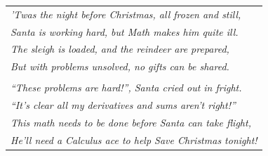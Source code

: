 \documentclass[12pt,letterpaper]{exam}
\begin{document}
\examtitle
{} 
\scores
\bottomline
\newpage

\phantom{.} \vfill
	\begin{table}[h]
	\centering
	\begin{tabular}{l}
	{\itshape ’Twas the night before Christmas, all frozen and still,} \\
	{\itshape Santa is working hard, but Math makes him quite ill.} \\
	{\itshape The sleigh is loaded, and the reindeer are prepared,} \\ 
	{\itshape But with problems unsolved, no gifts can be shared.} \\
	\\
	{\itshape ``These problems are hard!'', Santa cried out in fright.} \\
	{\itshape ``It's clear all my derivatives and sums aren't right!''} \\
	{\itshape This math needs to be done before Santa can take flight,} \\
	{\itshape He'll need a Calculus ace to help Save Christmas tonight!}
	\end{tabular}
	\end{table}
\phantom{.} \vfill 
\end{document}
